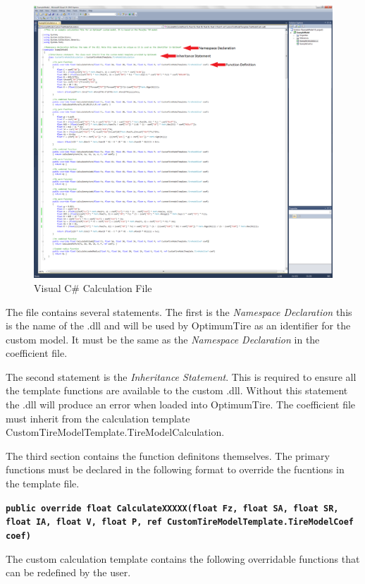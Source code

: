  \begin{figure}[H]
	\centering
		\includegraphics[width=1.0\textwidth]{CalcFileVC.png}
	\caption{Visual C\# Calculation File}
	\label{fig:CalcFileVC}
\end{figure}

The file contains several statements. The first is the \textsl{\textquotedbl Namespace Declaration\textquotedbl} this is the name of the .dll and will be used by OptimumTire as an identifier for the custom model. It must be the same as the \textsl{\textquotedbl Namespace Declaration\textquotedbl} in the coefficient file.

The second statement is the \textsl{\textquotedbl Inheritance Statement\textquotedbl}. This is required to ensure all the template functions are available to the custom .dll. Without this statement the .dll will produce an error when loaded into OptimumTire. The coefficient file must inherit from the calculation template CustomTireModelTemplate.TireModelCalculation.

The third section contains the function definitons themselves. The primary functions must be declared in the following format to override the fucntions in the template file.

\texttt{\textbf{public override float CalculateXXXXX(float Fz, float SA, float SR, float IA, float V, float P, ref CustomTireModelTemplate.TireModelCoef coef)}}

The custom calculation template contains the following overridable functions that can be redefined by the user.

